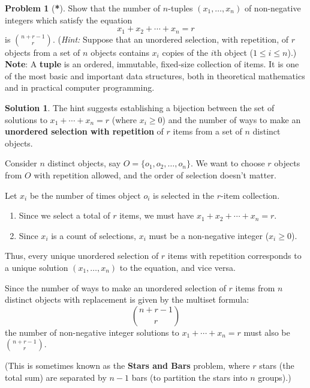 \documentclass[12pt,a4paper]{article}
\numberwithin{equation}{section}
\theoremstyle{plain}
\theoremstyle{definition}
\newtheorem{problem}{Problem}
\theoremstyle{solutionstyle}
\newtheorem*{solution*}{Solution} %
\theoremstyle{definition} %
\begin{document}
	\begin{problem}[\textbf{*}]
		Show that the number of $n$-tuples $(x_1, \ldots, x_n)$ of non-negative integers which satisfy the equation 
		\[
		x_1 + x_2 + \cdots + x_n = r
		\]
		is $\binom{n+r-1}{r}$. (\emph{Hint:} Suppose that an unordered selection, with repetition, of $r$ objects from a set of $n$ objects contains $x_i$ copies of the $i$th object ($1 \leq i \leq n$).)\\
		
		
		{\small \textbf{Note}: A \textbf{tuple} is an ordered, immutable, fixed-size collection of items. It is one of the most basic and important data structures, both in theoretical mathematics and in practical computer programming.}	\end{problem}
	
	\begin{solution*}
		The hint suggests establishing a bijection between the set of solutions to $x_1 + \cdots + x_n = r$ (where $x_i \geq 0$) and the number of ways to make an \textbf{unordered selection with repetition} of $r$ items from a set of $n$ distinct objects.
		
		Consider $n$ distinct objects, say $O = \{o_1, o_2, \ldots, o_n\}$. We want to choose $r$ objects from $O$ with repetition allowed, and the order of selection doesn't matter.
		
		Let $x_i$ be the number of times object $o_i$ is selected in the $r$-item collection.
		
		\begin{enumerate}
			\item Since we select a total of $r$ items, we must have $x_1 + x_2 + \cdots + x_n = r$.
			\item Since $x_i$ is a count of selections, $x_i$ must be a non-negative integer ($x_i \geq 0$).
		\end{enumerate}
		
		Thus, every unique unordered selection of $r$ items with repetition corresponds to a unique solution $(x_1, \ldots, x_n)$ to the equation, and vice versa.
		
		Since the number of ways to make an unordered selection of $r$ items from $n$ distinct objects with replacement is given by the multiset formula:
		\[
		\binom{n+r-1}{r}
		\]
		the number of non-negative integer solutions to $x_1 + \cdots + x_n = r$ must also be $\boxed{\binom{n+r-1}{r}}$.
		
		(This is sometimes known as the \textbf{Stars and Bars} problem, where $r$ stars (the total sum) are separated by $n-1$ bars (to partition the stars into $n$ groups).)
	\end{solution*}
	
\end{document}
